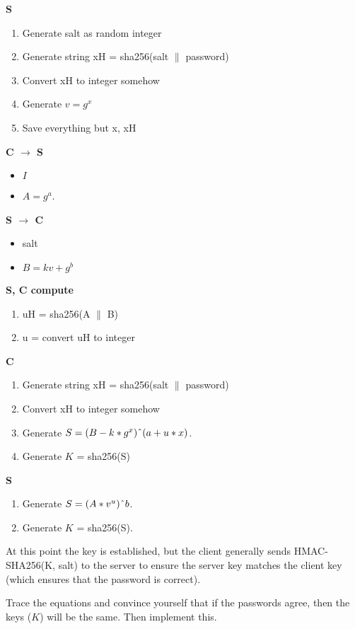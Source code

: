 \documentclass[11pt,oneside]{article}
\begin{document}
\textbf{S}
\begin{enumerate}
	\item Generate salt as random integer
	\item Generate string xH = sha256(salt $\|$ password)
	\item Convert xH to integer somehow
	\item Generate $v = g^x$
	\item Save everything but x, xH
\end{enumerate}

\textbf{C $\rightarrow$ S}
\begin{itemize}
	\item $I$
	\item $A = g^a$.
\end{itemize}

\textbf{S $\rightarrow$ C}
\begin{itemize}
	\item salt
	\item $B = kv + g^b$
\end{itemize}

\textbf{S, C compute}
\begin{enumerate}
	\item uH = sha256(A $\|$ B)
	\item u = convert uH to integer
\end{enumerate}

\textbf{C}
\begin{enumerate}
	\item Generate string xH = sha256(salt $\|$ password)
	\item Convert xH to integer somehow
	\item Generate $S = (B - k * g^x)\char`\^(a + u*x)$.
	\item Generate $K$ = sha256(S)
\end{enumerate}

\textbf{S}
\begin{enumerate}
	\item Generate $S = (A * v^u)\char`\^b$.
	\item Generate $K$ = sha256(S).
\end{enumerate}

At this point the key is established, but the client generally sends
HMAC-SHA256(K, salt) to the server to ensure the server key matches the client
key (which ensures that the password is correct).

Trace the equations and convince yourself that if the passwords agree, then the
keys ($K$) will be the same. Then implement this.
\end{document}
